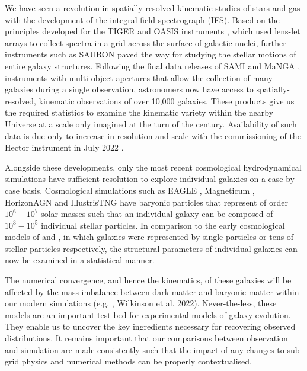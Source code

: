 \documentclass[
  journal=pasa,
  manuscript=research-paper, %
  year=2020,
  volume=37,
]{cup-journal}
\begin{document}
We have seen a revolution in spatially resolved kinematic studies of stars and gas with the development of the integral field spectrograph (IFS). Based on the principles developed for the \textsc{TIGER} and \textsc{OASIS} instruments \citep{Bacon19953DTIGER., Bacon2017OpticalAstronomy}, which used lens-let arrays to collect spectra in a grid across the surface of galactic nuclei, further instruments such as \textsc{SAURON} \citep{Bacon2001TheSpectrograph} paved the way for studying the stellar motions of entire galaxy structures. 
Following the final data releases of SAMI \citep{Croom2021TheTransitions} and MaNGA \citep{Abdurrouf2022TheData, Bundy2015OverviewObservatory}, instruments with multi-object apertures that allow the collection of many galaxies during a single observation, astronomers now have access to spatially-resolved, kinematic observations of over 10,000 galaxies.
These products give us the required statistics to examine the kinematic variety within the nearby Universe at a scale only imagined at the turn of the century.
Availability of such data is due only to increase in resolution and scale with the commissioning of the Hector instrument in July 2022 \citep{Bryant2020HectorTelescope}.

Alongside these developments, only the most recent cosmological hydrodynamical simulations have sufficient resolution to explore individual galaxies on a case-by-case basis.
Cosmological simulations such as EAGLE \citep{Schaye2015TheEnvironments, Crain2015TheVariations}, Magneticum \citep{Teklu2015ConnectingMorphology, Schulze2018KinematicsRedshifts}, HorizonAGN \citep{Dubois2014DancingWeb} and IllustrisTNG \citep{Pillepich2018SimulatingModel, Springel2018FirstClustering, Nelson2019Firstfeedback} have baryonic particles that represent of order $10^{6} - 10^{7}$ solar masses such that an individual galaxy can be composed of $10^{3} - 10^{5}$ individual stellar particles. 
In comparison to the early cosmological models of \citealt{Metzler1994Agalaxies} and \citealt{Katz1996CosmologicalTreeSPH}, in which galaxies were represented by single particles or tens of stellar particles respectively, the structural parameters of individual galaxies can now be examined in a statistical manner.

The numerical convergence, and hence the kinematics, of these galaxies will be affected by the mass imbalance between dark matter and baryonic matter within our modern  simulations (e.g. \citealt{Ludlow2019NumericalHaloes, Ludlow2021SpuriousParticles}, Wilkinson et al. 2022). 
Never-the-less, these models are an important test-bed for experimental models of galaxy evolution.
They enable us to uncover the key ingredients necessary for recovering observed distributions.
It remains important that our comparisons between observation and simulation are made consistently such that the impact of any changes to sub-grid physics and numerical methods can be properly contextualised. 
\end{document}
